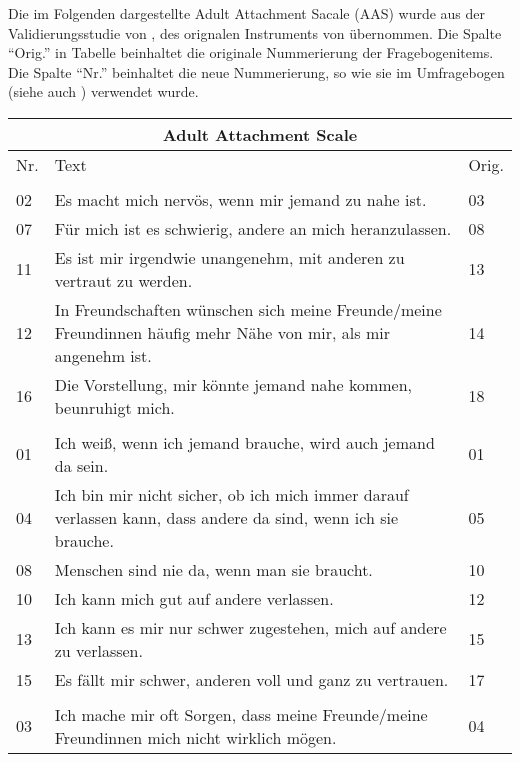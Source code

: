 
Die im Folgenden dargestellte Adult Attachment Sacale (AAS) wurde aus der Validierungsstudie von , des orignalen Instruments von  übernommen. Die Spalte \enquote{Orig.} in Tabelle  beinhaltet die originale Nummerierung der Fragebogenitems. Die Spalte \enquote{Nr.} beinhaltet die neue Nummerierung, so wie sie im Umfragebogen (siehe auch ) verwendet wurde.


\begin{table}[htbp]
\begin{tabular}{|l | m{30em} | p{2em}|} 
  \hline
  \multicolumn{3}{|c|}{\textbf{Adult Attachment Scale}}\\
  \hline
  Nr. & Text & Orig. \\ 
  \hline\hline
  \rowcolor{lightgray}
  \multicolumn{3}{|l|}{Nähe*}\\
  \hline
  02 & Es macht mich nervös, wenn mir jemand zu nahe ist. & 03 \\
  07 & Für mich ist es schwierig, andere an mich heranzulassen. & 08 \\
  11 & Es ist mir irgendwie unangenehm, mit anderen zu vertraut zu werden. & 13 \\
  12 & In Freundschaften wünschen sich meine Freunde/meine Freundinnen häufig mehr Nähe von mir, als mir angenehm ist. & 14 \\
  16 & Die Vorstellung, mir könnte jemand nahe kommen, beunruhigt mich. & 18 \\
  \hline
  \rowcolor{lightgray} \multicolumn{3}{|l|}{Vertrauen}\\
  \hline
  01 & Ich weiß, wenn ich jemand brauche, wird auch jemand da sein. & 01 \\
  04 & Ich bin mir nicht sicher, ob ich mich immer darauf verlassen kann, dass andere da sind, wenn ich sie brauche. & 05\\
  08 & Menschen sind nie da, wenn man sie braucht. & 10 \\
  10 & Ich kann mich gut auf andere verlassen. & 12\\
  13 & Ich kann es mir nur schwer zugestehen, mich auf andere zu verlassen. & 15\\
  15 & Es fällt mir schwer, anderen voll und ganz zu vertrauen. & 17\\
  \hline
  \rowcolor{lightgray} \multicolumn{3}{|l|}{Angst}\\
  \hline
  03 & Ich mache mir oft Sorgen, dass meine Freunde/meine Freundinnen mich nicht wirklich mögen. & 04\\

\end{tabular}
\end{table}
